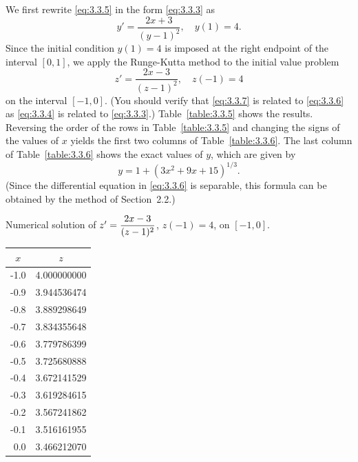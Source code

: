 \begin{examplesolution}
\solution We first rewrite \eqref{eq:3.3.5} in the form \eqref{eq:3.3.3} as
\begin{equation}
  \label{eq:3.3.6}y'=\frac{2x+3}{(y-1)^{2}},\quad y(1)=4.
\end{equation}
Since the initial condition $y(1)=4$ is imposed at the right endpoint of the interval $[0,1]$, we
apply the Runge-Kutta method to the initial value problem
\begin{equation}
  \label{eq:3.3.7}z'=\frac{2x-3}{(z-1)^{2}},\quad z(-1)=4
\end{equation}
on the interval $[-1,0]$. (You should verify that \eqref{eq:3.3.7} is related to \eqref{eq:3.3.6} as
\eqref{eq:3.3.4} is related to \eqref{eq:3.3.3}.) Table~\ref{table:3.3.5} shows the results.
Reversing the order of the rows in Table~\ref{table:3.3.5} and changing the signs of the values of
$x$ yields the first two columns of Table~\ref{table:3.3.6}. The last column of
Table~\ref{table:3.3.6} shows the exact values of $y$, which are given by
\[
  y=1+(3x^{2}+9x+15)^{1/3}.
\]
(Since the differential equation in \eqref{eq:3.3.6} is separable, this formula can be obtained by
the method of Section~2.2.)

\begin{newtable}
  \label{table:3.3.5} Numerical solution of $z'=\displaystyle\frac{2x-3}{(z-1)^{2}}$, $z(-1)=4$, on $[-1,0]$.
  \begin{center}
    \begin{tabular}{|r|r|}
      \hline
      \multicolumn{1}{|c|}{$x$} & \multicolumn{1}{|c|}{$z$} \\
      \hline
      -1.0                      & 4.000000000               \\
      -0.9                      & 3.944536474               \\
      -0.8                      & 3.889298649               \\
      -0.7                      & 3.834355648               \\
      -0.6                      & 3.779786399               \\
      -0.5                      & 3.725680888               \\
      -0.4                      & 3.672141529               \\
      -0.3                      & 3.619284615               \\
      -0.2                      & 3.567241862               \\
      -0.1                      & 3.516161955               \\
      0.0                       & 3.466212070               \\
      \hline
    \end{tabular}
  \end{center}
\end{newtable}


\end{examplesolution}
